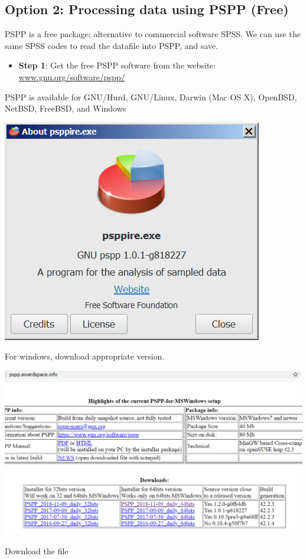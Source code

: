 \documentclass[
]{book}
\providecommand{\tightlist}{%
  \setlength{\itemsep}{0pt}\setlength{\parskip}{0pt}}
\begin{document}
\hypertarget{option-2-processing-data-using-pspp-free}{%
\subsection{Option 2: Processing data using PSPP (Free)}\label{option-2-processing-data-using-pspp-free}}

PSPP is a free package; alternative to commercial software SPSS. We can use the same SPSS codes to read the datafile into PSPP, and save.

\begin{itemize}
\tightlist
\item
  \textbf{Step 1}: Get the free PSPP software from the website: \href{http://www.gnu.org/software/pspp/}{www.gnu.org/software/pspp/}
\end{itemize}

PSPP is available for GNU/Hurd, GNU/Linux, Darwin (Mac OS X), OpenBSD, NetBSD, FreeBSD, and Windows

\includegraphics[width=0.65\linewidth]{images/abacus30}

For windows, download appropriate version.

\includegraphics[width=0.65\linewidth]{images/psppdownload0}

Download the file
\end{document}
